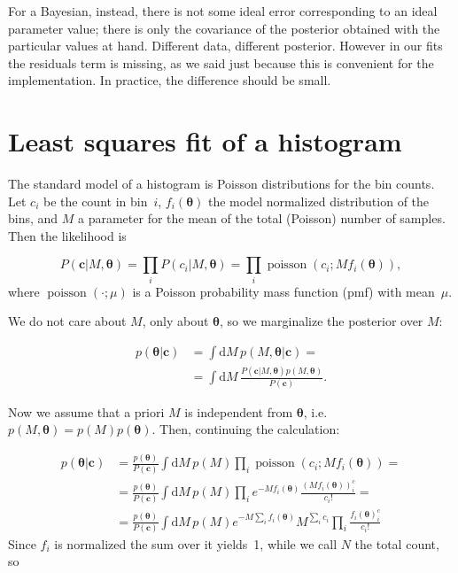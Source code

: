 
For a Bayesian, instead, there is not some ideal error corresponding to an
ideal parameter value; there is only the covariance of the posterior obtained
with the particular values at hand. Different data, different posterior.
However in our fits the residuals term is missing, as we said just because this
is convenient for the implementation. In practice, the difference should be
small.

\section{Least squares fit of a histogram}

The standard model of a histogram is Poisson distributions for the bin counts.
Let $c_i$ be the count in bin~$i$, $f_i(\boldsymbol\theta)$ the model
normalized distribution of the bins, and $M$ a parameter for the mean of the
total (Poisson) number of samples. Then the likelihood is

\begin{equation}
    P(\mathbf c|M,\boldsymbol\theta) =
    \prod_i P(c_i|M,\boldsymbol\theta) =
    \prod_i \operatorname{poisson}(c_i;Mf_i(\boldsymbol\theta)),
\end{equation}
%
where $\operatorname{poisson}(\cdot;\mu)$ is a Poisson probability mass
function (pmf) with mean~$\mu$.

We do not care about $M$, only about $\boldsymbol\theta$, so we marginalize
the posterior over $M$:

\begin{align}
    p(\boldsymbol\theta|\mathbf c)
    &= \int \mathrm dM\, p(M,\boldsymbol\theta|\mathbf c) = \\
    &= \int \mathrm dM\,
    \frac {P(\mathbf c|M,\boldsymbol\theta) p(M,\boldsymbol\theta)}
    {P(\mathbf c)}.
\end{align}

Now we assume that a priori $M$ is independent from $\boldsymbol\theta$, i.e.\ 
$p(M,\boldsymbol\theta) = p(M)p(\boldsymbol\theta)$. Then, continuing the
calculation:

\begin{align}
    p(\boldsymbol\theta|\mathbf c)
    &= \frac {p(\boldsymbol\theta)} {P(\mathbf c)}
    \int \mathrm dM\, p(M)
    \prod_i \operatorname{poisson}(c_i;Mf_i(\boldsymbol\theta)) = \\
    &= \frac {p(\boldsymbol\theta)} {P(\mathbf c)}
    \int \mathrm dM\, p(M)
    \prod_i
    e^{-Mf_i(\boldsymbol\theta)}
    \frac {(Mf_i(\boldsymbol\theta))^c_i} {c_i!} = \\
    &= \frac {p(\boldsymbol\theta)} {P(\mathbf c)}
    \int \mathrm dM\, p(M)
    e^{-M \sum_i f_i(\boldsymbol\theta)}
    M^{\sum_i c_i}
    \prod_i
    \frac {f_i(\boldsymbol\theta)^c_i} {c_i!}
\end{align}
%
Since $f_i$ is normalized the sum over it yields~1, while we call $N$ the total
count, so

